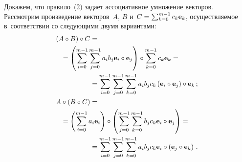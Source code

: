 \begin{multicols}{2}
  Докажем, что правило~(2) задает ассоциативное умножение векторов. 
Рассмотрим произведение векторов~$A$, $B$ и~$C\hm= 
\sum\nolimits_{k=0}^{m-1} c_k\mathbf{e}_k$, осуществляемое в~соответствии 
со следующими двумя вариантами: 
  \begin{align}
(A\circ B)\circ C &=\notag{}\\
  &\hspace*{-15mm}{}= \left( \sum\limits_{i=0}^{m-1} \sum\limits_{j=0}^{m-1} a_i 
b_j \mathbf{e}_i\circ \mathbf{e}_j\right) \circ \sum\limits_{k=0}^{m-1} 
c_k\mathbf{e}_k ={}\notag\\
&{}= \sum\limits_{i=0}^{m-1} \sum\limits_{j=0}^{m-1} 
\sum\limits_{k=0}^{m-1} a_i b_j c_k \left( \mathbf{e}_i\circ \mathbf{e}_j 
\right)\circ \mathbf{e}_k\,;
  \label{e3.1-f}
  \\
 A\circ( B\circ C) &={}\notag\\
  &\hspace*{-15mm}{}= \left( \sum\limits^{m-1}_{i=0} a_i \mathbf{e}_i\right) \circ 
\left( \sum\limits^{m-1}_{j=0} \sum\limits^{m-1}_{k=0} b_j c_k \mathbf{e}_i\circ 
\mathbf{e}_j\right) ={}\notag\\
&{}=\sum\limits_{i=0}^{m-1} \sum\limits_{j=0}^{m-1} 
\sum\limits^{m-1}_{k=0} a_i b_j c_k \mathbf{e}_i\circ \left( \mathbf{e}_j\circ 
\mathbf{e}_k \right)\,.
  \label{e3.2-f}
  \end{align}
  

\end{multicols}
